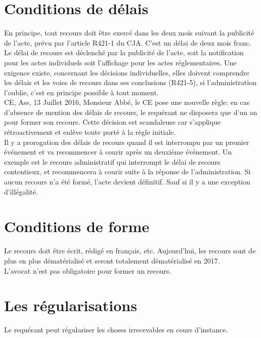 \documentclass[10pt, a4paper, openany]{book}
\begin{document}
\section{Conditions de délais}

En principe, tout recours doit être exercé dans les deux mois suivant la publicité de l'acte, prévu par l'article R421-1 du CJA. C'est un délai de deux mois franc. \\
Le délai de recours est déclenché par la publicité de l'acte, soit la notification pour les actes individuels soit l'affichage pour les actes réglementaires. Une exigence existe, concernant les décisions individuelles, elles doivent comprendre les délais et les voies de recours dans ses conclusions (R421-5), si l'administration l'oublie, c'est en principe possible à tout moment. \\
CE, Ass, 13 Juillet 2016, Monsieur Abbé, le CE pose une nouvelle règle: en cas d'absence de mention des délais de recours, le requérant ne disposera que d'un an pour former son recours. Cette décision est scandaleuse car s'applique rétroactivement et enlève toute porté à la règle initiale. \\
Il y a prorogation des délais de recours quand il est interrompu par un premier événement et va recommencer à courir après un deuxième événement. Un exemple est le recours administratif qui interrompt le délai de recours contentieux, et recommencera à courir suite à la réponse de l'administration. Si aucun recours n'a été formé, l'acte devient définitif. Sauf si il y a une exception d'illégalité. 

\section{Conditions de forme}

Le recours doit être écrit, rédigé en français, etc. Aujourd'hui, les recours sont de plus en plus dématérialisé et seront totalement dématérialisé en 2017. \\
L'avocat n'est pas obligatoire pour former un recours.

\section{Les régularisations}

Le requérant peut régulariser les choses irrecevables en cours d'instance. 
\end{document}
